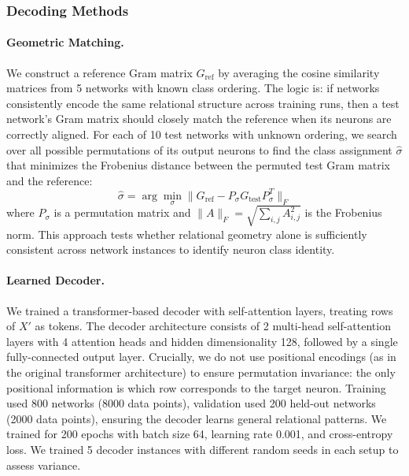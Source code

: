 \subsubsection{Decoding Methods}

\paragraph{Geometric Matching.} We construct a reference Gram matrix $G_{\text{ref}}$ by averaging the cosine similarity matrices from 5 networks with known class ordering. The logic is: if networks consistently encode the same relational structure across training runs, then a test network's Gram matrix should closely match the reference when its neurons are correctly aligned. For each of 10 test networks with unknown ordering, we search over all possible permutations of its output neurons to find the class assignment $\hat{\sigma}$ that minimizes the Frobenius distance between the permuted test Gram matrix and the reference:
\begin{equation}
\hat{\sigma} = \arg\min_{\sigma} \|G_{\text{ref}} - P_{\sigma} G_{\text{test}} P_{\sigma}^T\|_F
\end{equation}
where $P_{\sigma}$ is a permutation matrix and $\|A\|_F = \sqrt{\sum_{i,j} A_{i,j}^2}$ is the Frobenius norm. This approach tests whether relational geometry alone is sufficiently consistent across network instances to identify neuron class identity.

\paragraph{Learned Decoder.} We trained a transformer-based decoder \citep{vaswani2017attention} with self-attention layers, treating rows of $X'$ as tokens. The decoder architecture consists of 2 multi-head self-attention layers with 4 attention heads and hidden dimensionality 128, followed by a single fully-connected output layer. Crucially, we do not use positional encodings (as in the original transformer architecture) to ensure permutation invariance: the only positional information is which row corresponds to the target neuron. Training used 800 networks (8000 data points), validation used 200 held-out networks (2000 data points), ensuring the decoder learns general relational patterns. We trained for 200 epochs with batch size 64, learning rate 0.001, and cross-entropy loss. We trained 5 decoder instances with different random seeds in each setup to assess variance.

